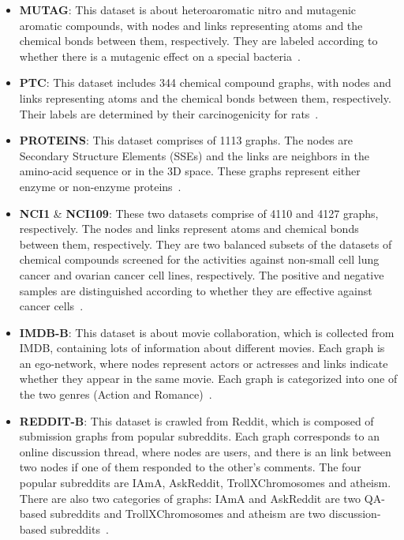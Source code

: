 \documentclass[10pt,journal,compsoc]{IEEEtran}
\begin{document}
\begin{itemize}
\item \textbf{\textsc{MUTAG}}: This dataset is about heteroaromatic nitro and mutagenic aromatic compounds, with nodes and links representing atoms and the chemical bonds between them, respectively. They are labeled according to whether there is a mutagenic effect on a special bacteria~\cite{debnath1991structure}.
\item \textbf{\textsc{PTC}}: This dataset includes 344 chemical compound graphs, with nodes and links representing atoms and the chemical bonds between them, respectively. Their labels are determined by their carcinogenicity for rats~\cite{toivonen2003statistical}.
\item \textbf{\textsc{PROTEINS}}: This dataset comprises of 1113 graphs. The nodes are Secondary Structure Elements (SSEs) and the links are neighbors in the amino-acid sequence or in the 3D space. These graphs represent either enzyme or non-enzyme proteins~\cite{borgwardt2005protein}.
\item \textbf{\textsc{NCI1}} \& \textbf{\textsc{NCI109}}: These two datasets comprise of 4110 and 4127 graphs, respectively. The nodes and links represent atoms and chemical bonds between them, respectively. They are two balanced subsets of the datasets of chemical compounds screened for the activities against non-small cell lung cancer and ovarian cancer cell lines, respectively. The positive and negative samples are distinguished according to whether they are effective against cancer cells~\cite{wale2008comparison}.
\item \textbf{\textsc{IMDB-B}}: This dataset is about movie collaboration, which is collected from IMDB, containing lots of information about different movies. Each graph is an ego-network, where nodes represent actors or actresses and links indicate whether they appear in the same movie. Each graph is categorized into one of the two genres (Action and Romance)~\cite{nguyen2018learning}.
\item \textbf{\textsc{REDDIT-B}}: This dataset is crawled from Reddit, which is composed of submission graphs from popular subreddits. Each graph corresponds to an online discussion thread, where nodes are users, and there is an link between two nodes if one of them responded to the other's comments. The four popular subreddits are IAmA, AskReddit, TrollXChromosomes and atheism. There are also two categories of graphs: IAmA and AskReddit are two QA-based subreddits and TrollXChromosomes and atheism are two discussion-based subreddits~\cite{yanardag2015deep}. \end{itemize}
\end{document}

